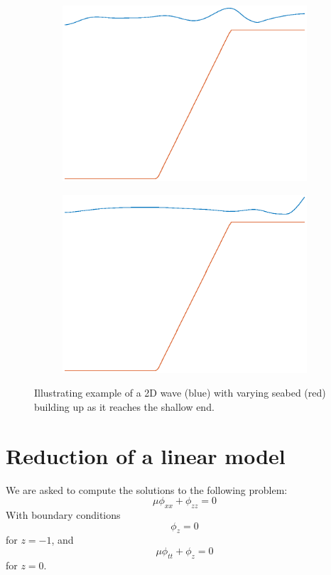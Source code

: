 \documentclass[12pt]{article}
\begin{document}
\begin{figure}[!h]
\begin{subfigure}[b]{0.24\textwidth}
\includegraphics[width=\textwidth]{fig/2dLin3.eps}
\label{fig1}
\end{subfigure}
\begin{subfigure}[b]{0.24\textwidth}
\includegraphics[width=\textwidth]{fig/2dLin4.eps}
\label{fig1}
\end{subfigure}
\caption{Illustrating example of a 2D wave (blue) with varying seabed (red) building up as it reaches the shallow end.}
\label{fig:2dWave}
\end{figure}
%
%
\section{Reduction of a linear model}
We are asked to compute the solutions to the following problem:
\begin{equation}
\mu \phi _{xx} + \phi_{zz} = 0
\label{eq-ana:sjefsproblemet}
\end{equation}
With boundary conditions
\begin{equation}
\phi _z = 0
\end{equation}
for $z = -1$, and
\begin{equation}
\mu \phi_{tt} + \phi_z = 0
\end{equation}
for $z = 0$.
\end{document}
